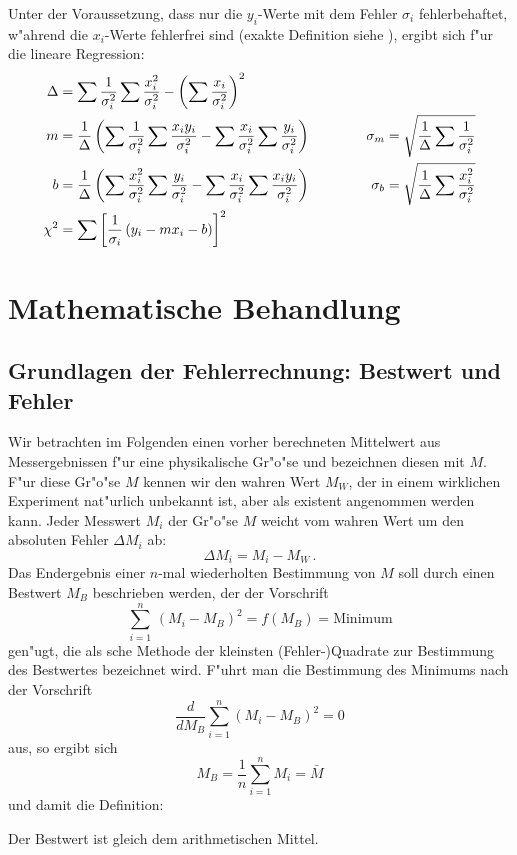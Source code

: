 Unter der Voraussetzung, dass nur die
$y_i$-Werte mit dem Fehler $\sigma_i$ fehlerbehaftet, w"ahrend die
$x_i$-Werte fehlerfrei sind (exakte Definition siehe
\cite{beving}), ergibt sich f"ur die lineare Regression:
\begin{align*}
\Delta&=\sum{\frac{1}{\sigma_i^2}}\sum{\frac{x_i^2}{\sigma_i^2}}-
\left(\sum{\frac{x_i}{\sigma_i^2}}\right)^2 & &
\\
%
m&=\frac{1}{\Delta}\left(\sum{\frac{1}{\sigma_i^2}}
\sum{\frac{x_iy_i}{\sigma_i^2}}-\sum{\frac{x_i}{\sigma_i^2}}\sum{\frac{y_i}{\sigma_i^2}}
\right)
&\sigma_m&=\sqrt{\frac{1}{\Delta}\sum{\frac{1}{\sigma_i^2}}} \\
%
b&=\frac{1}{\Delta}\left(\sum{\frac{x_i^2}{\sigma_i^2}}
\sum{\frac{y_i}{\sigma_i^2}}-\sum{\frac{x_i}{\sigma_i^2}}\sum{\frac{x_iy_i}{\sigma_i^2}}
\right) \hspace{11mm}
&\sigma_b&=\sqrt{\frac{1}{\Delta}\sum{\frac{x_i^2}{\sigma_i^2}}} \\
%
\chi^2&=\sum{\left[\frac{1}{\sigma_i}\left(y_i-mx_i-b\right)\right]^2} & &
\end{align*}


\section{Mathematische Behandlung}

\subsection{Grundlagen der Fehlerrechnung: Bestwert und Fehler}

Wir betrachten im Folgenden einen vorher berechneten Mittelwert
aus Messergebnissen f"ur eine physikalische Gr"o"se und bezeichnen
diesen mit $M$. F"ur diese Gr"o"se $M$ kennen wir den wahren Wert
$M_W$, der in einem wirklichen Experiment nat"urlich unbekannt ist,
aber als existent angenommen werden kann. Jeder Messwert $M_i$ der
Gr"o"se $M$ weicht vom wahren Wert um den absoluten Fehler $\Delta M_i$
ab:
%
\begin{equation} \label{b}
 \Delta M_i = M_i - M_W \, .
\end{equation}
%
Das Endergebnis einer $n$-mal wiederholten Bestimmung von $M$ soll
durch einen Bestwert $M_B$ beschrieben werden, der der Vorschrift
%
\begin{equation} \label{c}
\sum_{i=1}^{n}\, (M_{i} - M_{B})^{2} = f(M_{B}) = \mbox{Minimum}
\end{equation}
%
gen"ugt, die als sche Methode der kleinsten
(Fehler-)Quadrate zur Bestimmung des Bestwertes
bezeichnet wird. F"uhrt man die Bestimmung des Minimums nach der
Vorschrift
%
\begin{equation} \label{d}
 \frac{d}{d M_B} \sum_{i=1}^{n}(M_{i} - M_{B})^{2} = 0
\end{equation}
%
aus, so ergibt sich
%
\begin{equation} \label{e}
 M_{B} = \frac{1}{n} \sum_{i=1}^{n} M_{i} = \bar M
\end{equation}
%
und damit die Definition:
%
\begin{definition} \label{def:bestwert}
  Der Bestwert ist gleich dem arithmetischen Mittel.
\end{definition}

